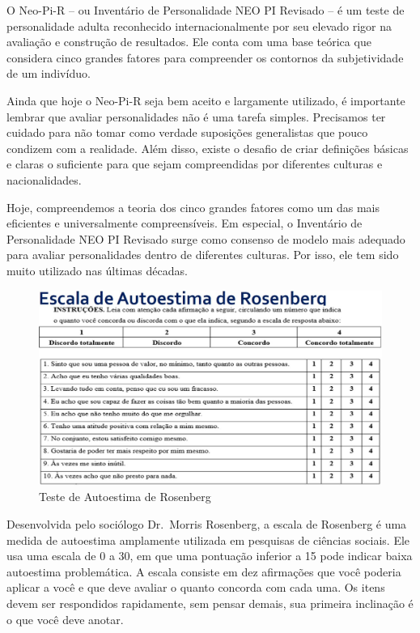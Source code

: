 \documentclass[
]{book}
\begin{document}
O Neo-Pi-R -- ou Inventário de Personalidade NEO PI Revisado -- é um teste de personalidade adulta reconhecido internacionalmente por seu elevado rigor na avaliação e construção de resultados. Ele conta com uma base teórica que considera cinco grandes fatores para compreender os contornos da subjetividade de um indivíduo.

Ainda que hoje o Neo-Pi-R seja bem aceito e largamente utilizado, é importante lembrar que avaliar personalidades não é uma tarefa simples. Precisamos ter cuidado para não tomar como verdade suposições generalistas que pouco condizem com a realidade. Além disso, existe o desafio de criar definições básicas e claras o suficiente para que sejam compreendidas por diferentes culturas e nacionalidades.

Hoje, compreendemos a teoria dos cinco grandes fatores como um das mais eficientes e universalmente compreensíveis. Em especial, o Inventário de Personalidade NEO PI Revisado surge como consenso de modelo mais adequado para avaliar personalidades dentro de diferentes culturas. Por isso, ele tem sido muito utilizado nas últimas décadas.

\begin{figure}

{\centering \includegraphics[width=0.8\linewidth]{imagens/teste-autoestima-rosenberg} 

}

\caption{Teste de Autoestima de Rosenberg}\label{fig:unnamed-chunk-13}
\end{figure}

Desenvolvida pelo sociólogo Dr.~Morris Rosenberg, a escala de Rosenberg é uma medida de autoestima amplamente utilizada em pesquisas de ciências sociais. Ele usa uma escala de 0 a 30, em que uma pontuação inferior a 15 pode indicar baixa autoestima problemática. A escala consiste em dez afirmações que você poderia aplicar a você e que deve avaliar o quanto concorda com cada uma. Os itens devem ser respondidos rapidamente, sem pensar demais, sua primeira inclinação é o que você deve anotar.
\end{document}
